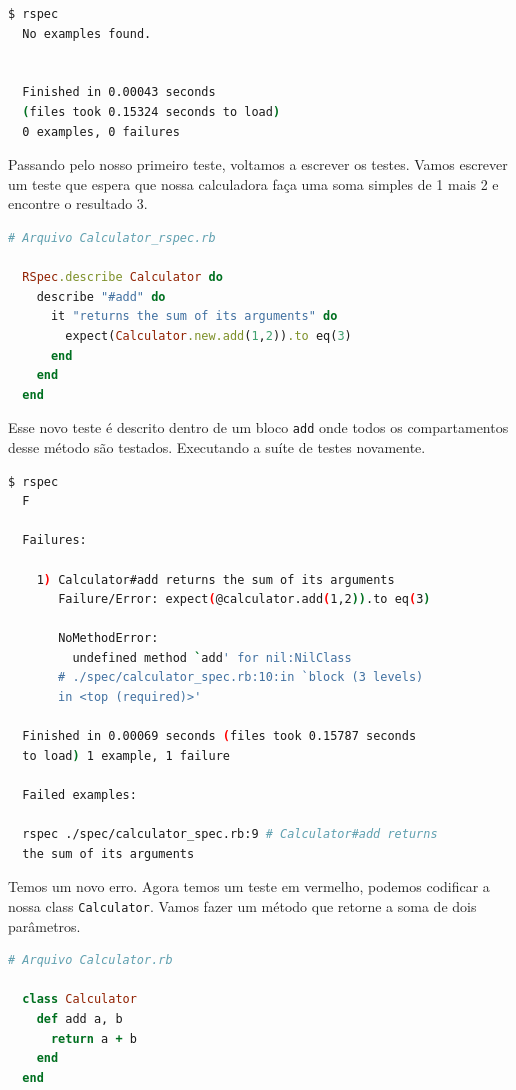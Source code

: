 \documentclass[12pt]{article}
\newcommand{\code}[1]{\texttt{#1}}
\begin{document}
  \begin{lstlisting}[language=bash]
  $ rspec
  No examples found.


  Finished in 0.00043 seconds 
  (files took 0.15324 seconds to load)
  0 examples, 0 failures
  \end{lstlisting}

  Passando pelo nosso primeiro teste, voltamos a escrever os testes. Vamos 
  escrever um teste que espera que nossa calculadora faça uma soma simples de 
  1 mais 2 e encontre o resultado 3.

  \begin{lstlisting}[language=Ruby]
  # Arquivo Calculator_rspec.rb

  RSpec.describe Calculator do
    describe "#add" do
      it "returns the sum of its arguments" do
        expect(Calculator.new.add(1,2)).to eq(3)
      end
    end
  end
  \end{lstlisting}

  Esse novo teste é descrito dentro de um bloco \code{add} onde todos os 
  compartamentos desse método são testados. Executando a suíte de testes
  novamente.

  \begin{lstlisting}[language=bash]
  $ rspec
  F

  Failures:

    1) Calculator#add returns the sum of its arguments 
       Failure/Error: expect(@calculator.add(1,2)).to eq(3)
       
       NoMethodError:
         undefined method `add' for nil:NilClass
       # ./spec/calculator_spec.rb:10:in `block (3 levels) 
       in <top (required)>'

  Finished in 0.00069 seconds (files took 0.15787 seconds 
  to load) 1 example, 1 failure

  Failed examples:

  rspec ./spec/calculator_spec.rb:9 # Calculator#add returns 
  the sum of its arguments 
  \end{lstlisting}
  
  Temos um novo erro. Agora temos um teste em vermelho, podemos codificar a
  nossa class \code{Calculator}. Vamos fazer um método que retorne a soma de
  dois parâmetros.

  \begin{lstlisting}[language=Ruby]
  # Arquivo Calculator.rb

  class Calculator
    def add a, b
      return a + b
    end
  end
  \end{lstlisting}
\end{document}
